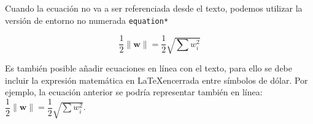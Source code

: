 Cuando la ecuación no va a ser referenciada desde el texto, podemos utilizar la versión de entorno no numerada \verb|equation*|

\begin{equation*}
\label{Eq:ejemplo_ecuacion2}
\dfrac{1}{2}\parallel\mathbf{w}\parallel=\dfrac{1}{2}\sqrt{\sum w_{i}^{2}}
\end{equation*}

Es también posible añadir ecuaciones en línea con el texto, para ello se debe incluir la expresión matemática en \LaTeX encerrada entre símbolos de dólar. Por ejemplo, la ecuación anterior se podría representar también en línea: $\dfrac{1}{2}\parallel\mathbf{w}\parallel=\dfrac{1}{2}\sqrt{\sum w_{i}^{2}}$.

